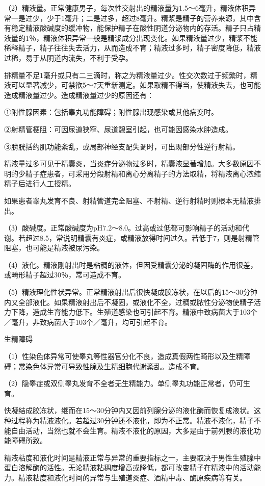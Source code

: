 \documentclass[12pt,UTF8,openany]{ctexbook}
\begin{document}
（2）精液量。正常健康男子，每次性交射出的精液量为1.5～6毫升，精液体积异常一是过少，少于1毫升；二是过多，超过8毫升。精浆是精子的营养来源，其中含有稳定精液酸碱度的缓冲物，能保护精子在酸性阴道分泌物内的存活。精子只占精液量的1％，精液体积异常一般是精浆成分出现变化。如果精液量过少，精浆不能稀释精子，精子往往失去活力，从而造成不育；精液过多时，精子密度降低，精液过稀，易于从阴道内流失，不利于受孕。

排精量不足1毫升或只有二三滴时，称之为精液量过少。性交次数过于频繁时，精液可以显著减少，可禁欲5～7天重新测定。如果取精不得当，使精液失去，也可能造成精液量过少。造成精液量过少的原因还有：

①附性腺因素：包括睾丸功能障碍；附性腺出现感染或其他病变时。

②射精管梗阻：可因尿道狭窄、尿道憩室引起，也可能因感染水肿造成。

③膀胱括约肌功能紊乱，或局部神经支配失调时，可出现部分性逆行射精。

精液量过多可见于精囊炎，当炎症分泌物过多时，精囊液显著增加。大多数原因不明的少精子症患者，可采用分段射精和离心分离精子的方法取精，将精液离心浓缩精子后进行人工授精。

如果患者睾丸发育不良、射精管道完全阻塞、不射精、逆行射精时则根本无精液排出。

（3）酸碱度。正常酸碱度为pH7.2～8.0。过高或过低都可影响精子的活动和代谢。若超过8.5，常说明精囊有炎症，或精液放得时间过久。若低于7，则是射精管阻塞，也可能是精液被尿污染。

（4）液化。精液刚射出时是粘稠的液体，但因受精囊分泌的凝固酶的作用很差，或畸形精子超过30％，常可造成不育。

（5）精液理化性状异常。正常精液射出后很快凝成胶冻状，在以后的15～30分钟内又全部液化。如果精液射出后不凝固，或液化不全，过稠或脓性分泌物使精子活力下降，造成生育能力低下。生殖道感染也可引起不育。精液中致病菌大于103个／毫升，非致病菌大于103个／毫升，均可引起不育。

生精障碍

（1）性染色体异常可使睾丸等性器官分化不良，造成真假两性畸形以及生精障碍；常染色体异常可导致性腺及生精细胞代谢紊乱。造成不育。

（2）隐睾症或双侧睾丸发育不全者无生精能力。单侧睾丸功能正常者，仍可生育。

快凝结成胶冻状，继而在15～30分钟内又因前列腺分泌的液化酶而恢复成液状。这种过程称为精液液化。若超过30分钟还不液化，即为不正常。精液不液化，精子不能自由活动，当然也就不会生育。精液不液化的原因，大多是由于前列腺的液化功能障碍所致。

精液粘度和液化时间是精液正常与异常的重要指标之一，主要取决于男性生殖腺中蛋白溶解酶的活性。无论精液粘稠度增高或降低，都可改变精子在精液中的活动能力。精液粘度和液化时间的异常与生殖道炎症、酒精中毒、酶原疾病等有关。
\end{document}

